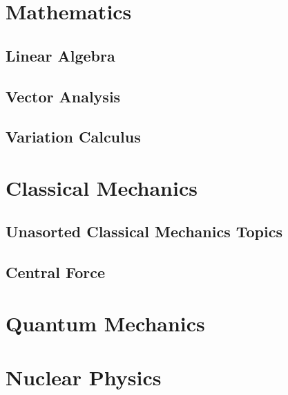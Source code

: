 \documentclass[10pt]{report}
\begin{document}
\chapter*{Mathematics}
\pagestyle{empty}

\section*{Linear Algebra}
\clearpage

\section*{Vector Analysis}
\clearpage

\section*{Variation Calculus}
\clearpage

\chapter*{Classical Mechanics}
\section*{Unasorted Classical Mechanics Topics}
\clearpage

\section*{Central Force}
\clearpage

\chapter*{Quantum Mechanics}
\clearpage
\clearpage

\chapter*{Nuclear Physics}
\clearpage
%
\end{document}
